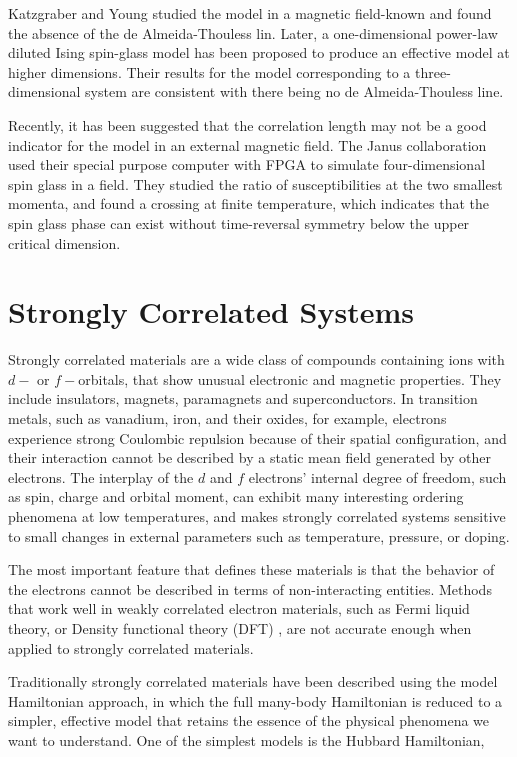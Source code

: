 Katzgraber and Young studied the model in a magnetic field-known and 
found the absence of the de Almeida-Thouless lin. Later, a one-dimensional 
power-law diluted Ising spin-glass model has been proposed to produce an
effective model at higher dimensions\cite{Young-Katzgraber2004}. Their results for the model 
corresponding to a three-dimensional system are consistent with there being no 
de Almeida-Thouless line.

Recently, it has been suggested that the correlation length may not be a 
good indicator for the model in an external magnetic field.
The Janus collaboration \cite{Banos-2012,TheJanusCollaboration:2012:JFS:2322156.2322158} 
used their special purpose computer with FPGA to simulate
four-dimensional spin glass in a field. They studied the ratio of susceptibilities 
at the two smallest momenta, and found a crossing at finite temperature, which 
indicates that the spin glass phase can exist without time-reversal symmetry
below the upper critical dimension.


\section{Strongly Correlated Systems}
Strongly correlated materials are a wide class of compounds containing ions 
with $d-$ or $f-$orbitals, that show unusual electronic and magnetic properties. 
They include insulators, magnets, paramagnets and superconductors. In transition
metals, such as vanadium, iron, and their oxides, for example, electrons experience
strong Coulombic repulsion because of their spatial configuration, and their 
interaction cannot be described by a static mean field generated by other electrons.
\cite{RevModPhys.56.99,RevModPhys.70.1039}
The interplay of the $d$ and $f$ electrons' internal degree of freedom, such as
spin, charge and orbital moment, can exhibit many interesting ordering phenomena
at low temperatures, and makes strongly correlated systems sensitive to small
changes in external parameters such as temperature, pressure, or doping. 

The most important feature that defines these materials is that the behavior of the electrons
cannot be described in terms of non-interacting entities. Methods that work well
in weakly correlated electron materials, such as Fermi liquid theory, or Density
functional theory (DFT) \cite{RevModPhys.61.689}, are not accurate enough when applied to strongly 
correlated materials. 

Traditionally strongly correlated materials have been described using the model Hamiltonian 
approach, in which the full many-body Hamiltonian is reduced to a simpler, effective
model that retains the essence of the physical phenomena we want to understand.
One of the simplest models is the Hubbard Hamiltonian, 

